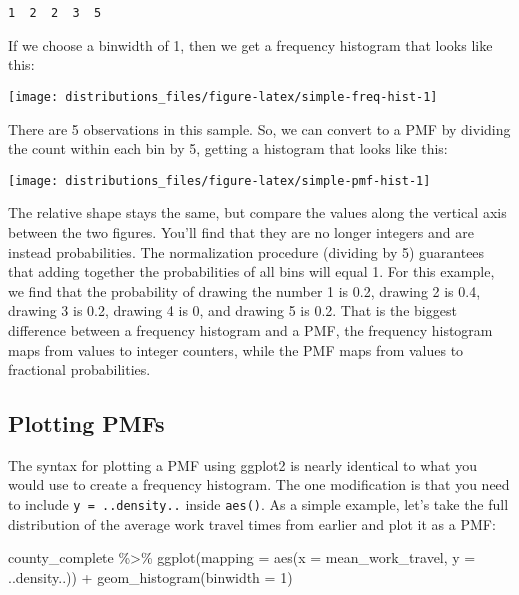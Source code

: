 \documentclass[
]{book}
\newenvironment{Shaded}{\begin{snugshade}}{\end{snugshade}}
\newcommand{\AttributeTok}[1]{\textcolor[rgb]{0.77,0.63,0.00}{#1}}
\newcommand{\DecValTok}[1]{\textcolor[rgb]{0.00,0.00,0.81}{#1}}
\newcommand{\FunctionTok}[1]{\textcolor[rgb]{0.00,0.00,0.00}{#1}}
\newcommand{\NormalTok}[1]{#1}
\newcommand{\SpecialCharTok}[1]{\textcolor[rgb]{0.00,0.00,0.00}{#1}}
\begin{document}
\begin{verbatim}
1  2  2  3  5
\end{verbatim}

If we choose a binwidth of 1, then we get a frequency histogram that looks like this:

\begin{center}\texttt{[image: distributions\_files/figure-latex/simple-freq-hist-1]} \end{center}

There are 5 observations in this sample.
So, we can convert to a PMF by dividing the count within each bin by 5, getting a histogram that looks like this:

\begin{center}\texttt{[image: distributions\_files/figure-latex/simple-pmf-hist-1]} \end{center}

The relative shape stays the same, but compare the values along the vertical axis between the two figures.
You'll find that they are no longer integers and are instead probabilities.
The normalization procedure (dividing by 5) guarantees that adding together the probabilities of all bins will equal 1.
For this example, we find that the probability of drawing the number 1 is 0.2, drawing 2 is 0.4, drawing 3 is 0.2, drawing 4 is 0, and drawing 5 is 0.2.
That is the biggest difference between a frequency histogram and a PMF, the frequency histogram maps from values to integer counters, while the PMF maps from values to fractional probabilities.

\hypertarget{plotting-pmfs}{%
\subsection{Plotting PMFs}\label{plotting-pmfs}}

The syntax for plotting a PMF using {ggplot2} is nearly identical to what you would use to create a frequency histogram.
The one modification is that you need to include \texttt{y\ =\ ..density..} inside \texttt{aes()}.
As a simple example, let's take the full distribution of the average work travel times from earlier and plot it as a PMF:

\begin{Shaded}
\begin{Highlighting}[]
\NormalTok{county\_complete }\SpecialCharTok{\%\textgreater{}\%}
  \FunctionTok{ggplot}\NormalTok{(}\AttributeTok{mapping =} \FunctionTok{aes}\NormalTok{(}\AttributeTok{x =}\NormalTok{ mean\_work\_travel, }\AttributeTok{y =}\NormalTok{ ..density..)) }\SpecialCharTok{+}
  \FunctionTok{geom\_histogram}\NormalTok{(}\AttributeTok{binwidth =} \DecValTok{1}\NormalTok{)}
\end{Highlighting}
\end{Shaded}
\end{document}
